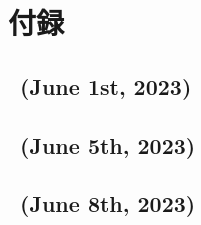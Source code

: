 \chapter*{付録}
\pagestyle{appendixstyle}
\setcounter{section}{0}
\renewcommand{\thelstlisting}{\thesection-\arabic{lstlisting}}
\renewcommand{\thesection}{\Alph{section}}
\newcommand{\secref}[1]{{#1}}
\makeatletter
{}
\makeatother
{}
\section{\kadaia\ (June 1st, 2023)}


\section{\kadaib\ (June 5th, 2023)}

\section{\kadaic\ (June 8th, 2023)}

